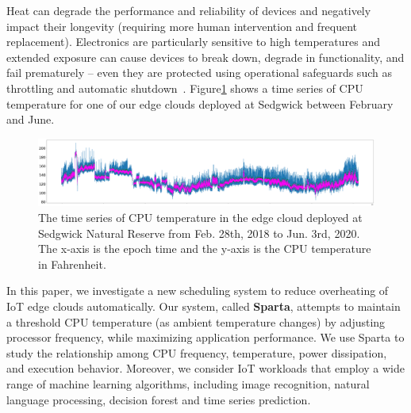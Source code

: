 Heat can degrade the performance and reliability of devices and negatively
impact their longevity (requiring more human intervention and frequent replacement).
Electronics are particularly sensitive to high temperatures and extended exposure
can cause devices to break down, degrade in functionality,
and fail prematurely -- 
even they are protected using operational safeguards 
such as throttling and automatic shutdown~\cite{ref:overheating}. 
Figure\ref{fig:time_series} shows a time series of CPU temperature for one of
our edge clouds deployed at Sedgwick between February and June. 

\begin{figure}
\includegraphics[width=\textwidth]{figures/time_series.png}
\caption{The time series of CPU temperature in the edge cloud deployed at Sedgwick Natural Reserve from Feb. 28th, 2018 to Jun. 3rd, 2020. The x-axis is the epoch time and the y-axis is the CPU temperature in Fahrenheit. } \label{fig:time_series}
\end{figure}

In this paper, we investigate a new scheduling system to reduce 
overheating of IoT edge clouds automatically. Our system, called \textbf{Sparta},
attempts to maintain a threshold CPU temperature (as ambient temperature
changes) by adjusting processor frequency, while maximizing application performance.
We use Sparta to study the relationship among CPU frequency, temperature, power dissipation, and execution behavior. Moreover, we consider IoT workloads that employ a wide range of
machine learning algorithms, including image recognition, natural language processing, decision forest and time series prediction. 


